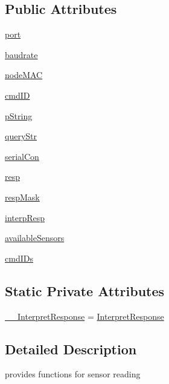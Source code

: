 \subsection*{Public Attributes}
\begin{DoxyCompactItemize}
\item 
\hyperlink{classreadsensor_1_1ReadSensor_aa5479d51839a34226df007973db5b28a}{port}
\item 
\hyperlink{classreadsensor_1_1ReadSensor_a55ad7cd6f26347c571cdc03025d52449}{baudrate}
\item 
\hyperlink{classreadsensor_1_1ReadSensor_aca28301a80b828d13f180b3560acd929}{node\+M\+AC}
\item 
\hyperlink{classreadsensor_1_1ReadSensor_a3f1a8b0a95d14b00ceeb4a1d90db4146}{cmd\+ID}
\item 
\hyperlink{classreadsensor_1_1ReadSensor_a260848062ae91ce183d5b8a7bb4336a9}{p\+String}
\item 
\hyperlink{classreadsensor_1_1ReadSensor_ac90ad89a36244ff79ec5de39250dbe65}{query\+Str}
\item 
\hyperlink{classreadsensor_1_1ReadSensor_ab85a47186a692e87ed91dfbd6421ac9f}{serial\+Con}
\item 
\hyperlink{classreadsensor_1_1ReadSensor_a3bfdf8d80b9b2c6e3756546f66684543}{resp}
\item 
\hyperlink{classreadsensor_1_1ReadSensor_a2add837e5b36f9242b3481f30be5ace9}{resp\+Mask}
\item 
\hyperlink{classreadsensor_1_1ReadSensor_aa9c0ba1400248735f49ccf7f4d7fcbec}{interp\+Resp}
\item 
\hyperlink{classreadsensor_1_1ReadSensor_ae04c9a7ad4cb4a0c68225cea810f9edd}{available\+Sensors}
\item 
\hyperlink{classreadsensor_1_1ReadSensor_ab313380d075409d1fccdd2b47c958cc9}{cmd\+I\+Ds}
\end{DoxyCompactItemize}
\subsection*{Static Private Attributes}
\begin{DoxyCompactItemize}
\item 
\hyperlink{classreadsensor_1_1ReadSensor_a26862f7f2d34ceb3201cfeb7339dd21b}{\+\_\+\+\_\+\+Interpret\+Response} = \hyperlink{classreadsensor_1_1ReadSensor_af42ab8caf111db6f14d49cbcfad445c3}{Interpret\+Response}
\end{DoxyCompactItemize}


\subsection{Detailed Description}
\begin{DoxyVerb}provides functions for sensor reading\end{DoxyVerb}
 

